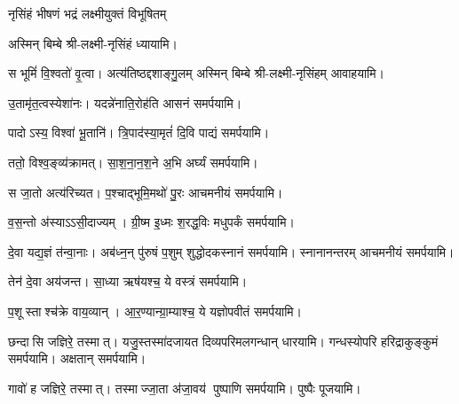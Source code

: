 \begin{center}


{नृसिंहं भीषणं भद्रं लक्ष्मीयुक्तं विभूषितम्}

अस्मिन् बिम्बे श्री-लक्ष्मी-नृसिंहं ध्यायामि।
\medskip

{स भूमिं॑ वि॒श्वतो॑ वृ॒त्वा। अत्य॑तिष्ठद्दशाङ्गु॒लम्}
अस्मिन् बिम्बे श्री-लक्ष्मी-नृसिंहम् आवाहयामि।
\medskip

 {उ॒तामृ॑त॒त्वस्येशा॑नः। यदन्ने॑नाति॒रोह॑ति}
 आसनं समर्पयामि।\medskip

{पादोऽस्य॒ विश्वा॑ भू॒तानि॑। त्रि॒पाद॑स्या॒मृतं॑ दि॒वि}
 पाद्यं समर्पयामि।\medskip
 
{ततो॒ विश्व॒ङ्व्य॑क्रामत्। सा॒श॒ना॒न॒श॒ने अ॒भि}
 अर्घ्यं समर्पयामि।\medskip

{स जा॒तो अत्य॑रिच्यत। प॒श्चाद्भूमि॒मथो॑ पु॒रः}
 आचमनीयं समर्पयामि।\medskip

{व॒स॒न्तो अ॑स्याऽऽसी॒दाज्यम्। ग्री॒ष्म इ॒ध्मः श॒रद्ध॒विः}
मधुपर्कं समर्पयामि।\medskip

 {दे॒वा यद्य॒ज्ञं त॑न्वा॒नाः। अब॑ध्न॒न् पु॑रुषं प॒शुम्}
 शुद्धोदकस्नानं समर्पयामि। स्नानानन्तरम् आचमनीयं समर्पयामि।\medskip

 {तेन॑ दे॒वा अय॑जन्त। सा॒ध्या ऋष॑यश्च॒ ये}
 वस्त्रं समर्पयामि।\medskip

{प॒शूस्ताश्च॑क्रे वाय॒व्यान्। आ॒र॒ण्यान्ग्रा॒म्याश्च॒ ये}
 यज्ञोपवीतं समर्पयामि।\medskip

{छन्दासि जज्ञिरे॒ तस्मात्। यजु॒स्तस्मा॑दजायत}
 दिव्यपरिमलगन्धान् धारयामि। गन्धस्योपरि हरिद्राकुङ्कुमं समर्पयामि। अक्षतान् समर्पयामि।\medskip

{गावो॑ ह जज्ञिरे॒ तस्मात्। तस्माज्जा॒ता अ॑जा॒वय॑}
 पुष्पाणि समर्पयामि।  पुष्पैः पूजयामि।


\end{center}
